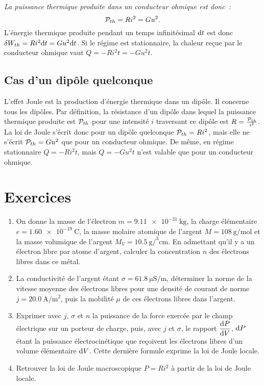 \emph{La puissance thermique produite dans un conducteur ohmique est donc~:}%
\begin{equation}\label{eq:loidejoule}%
\P_{th} = Ri^2=Gu^2.
\end{equation}%
L'énergie thermique produite pendant un temps infinitésimal \(\D t\) est donc 
\(\delta W_{th} = Ri^2 \D t = Gu^2 \D t\). Si le régime est stationnaire, la 
chaleur reçue par le conducteur ohmique vaut \(Q = -Ri^2 t = -Gu^2 t\).

\subsection{Cas d'un dipôle quelconque}%

L'effet Joule est la production d'énergie thermique dans un dipôle. Il concerne 
tous les dipôles. Par définition, la résistance d'un dipôle dans lequel la 
puissance thermique produite est \(\P_{th}\) pour une intensité \(i\) 
traversant ce dipôle est \(R = \frac{\P_{th}}{i^2}\). La loi de Joule s'écrit 
donc pour un dipôle quelconque \(\P_{th} = Ri^2\), mais elle ne s'écrit 
\(\P_{th} = Gu^2\) que pour un conducteur ohmique. De même, en régime 
stationnaire \(Q = -Ri^2 t\), mais \(Q=-Gu^2t\) n'est valable que pour un 
conducteur ohmique.

\clearpage
\section{Exercices}%
\begin{exercice}%
  \begin{enumerate}
    \item On donne la masse de l'électron \(m=\SI{9.11e-31}{\kilogram}\), la 
      charge élémentaire \(e = \SI{1.60e-19}{\coulomb}\), la masse molaire 
      atomique de l'argent \(M=\SI{108}{\gram\per\mole}\) et la masse volumique 
      de l'argent \(M_V = \SI{10.5}{\gram\per\cubed\centi\meter}\). En 
      admettant qu'il y a un électron libre par atome d'argent, calculer la 
      concentration \(n\) des électrons libres dans ce métal.
    \item La conductivité de l'argent étant \(\sigma = 
      \SI{61.8}{\micro\siemens\per\meter}\), déterminer la norme de la vitesse 
      moyenne des électrons libres pour une densité de courant de norme 
      \(j=\SI{20.0}{\ampere\per\meter\squared}\), puis la mobilité \(\mu\) de 
      ces électrons libres dans l'argent.
    \item Exprimer avec \(j\), \(\sigma\) et \(n\) la puissance de la force 
      exercée par le champ électrique sur un porteur de charge, puis, avec 
      \(j\) et \(\sigma\), le rapport \(\derived{P}{V}\), \(\D P\) étant la 
      puissance électrocinétique que reçoivent les électrons libres d'un volume 
      élémentaire \(\D V\). Cette dernière formule exprime la loi de Joule 
      locale.
    \item Retrouver la loi de Joule macroscopique \(P=Ri^2\) à partir de la loi 
      de Joule locale.
  \end{enumerate}
\end{exercice}%

